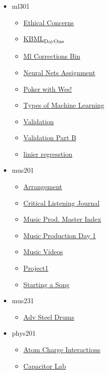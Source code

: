 \documentclass[11pt]{article}
\begin{document}
\begin{itemize}
\begin{itemize}
\end{itemize}
\item ml301
\begin{itemize}
\item \href{ml301/KBEthicalConcerns.org}{Ethical Concerns}
\item \href{ml301/KBML\_Day\_One.org}{KBML\textsubscript{Day}\textsubscript{One}}
\item \href{ml301/KBMLCorrectionsBin.org}{Ml Corrections Bin}
\item \href{ml301/KBmlNeuralNetsAssignment.org}{Neural Nets Assignment}
\item \href{ml301/KBPoker\_With\_Wes.org}{Poker with Wes!}
\item \href{ml301/KBTypes\_of\_Machine\_Learning.org}{Types of Machine Learning}
\item \href{ml301/KBValidation.org}{Validation}
\item \href{ml301/KBValidationPB.org}{Validation Part B}
\item \href{ml301/KBLinierRegression.org}{linier regresstion}
\end{itemize}
\item mus201
\begin{itemize}
\item \href{mus201/KBhMUS150Arrangement.org}{Arrangement}
\item \href{mus201/KBhMUS150CriticalListeningJournal.org}{Critical Listening Journal}
\item \href{mus201/KbMUS150INDEX.org}{Music Prod. Master Index}
\item \href{mus201/KBhMUS150D1.org}{Music Production Day 1}
\item \href{mus201/KBhMUS150MusicVideos.org}{Music Videos}
\item \href{mus201/KBhMUS150Project1.org}{Project1}
\item \href{mus201/KBhMUS150StartingASong.org}{Starting a Song}
\end{itemize}
\item mus231
\begin{itemize}
\item \href{mus231/KB20200824111126.org}{Adv Steel Drums}
\end{itemize}
\item phys201
\begin{itemize}
\item \href{phys201/KBhPHYS201AtomInteractions.org}{Atom Charge Interactions}
\item \href{phys201/KBe20phys250retCapacitorsLab.org}{Capacitor Lab}

\end{itemize}
\end{itemize}
\end{document}
